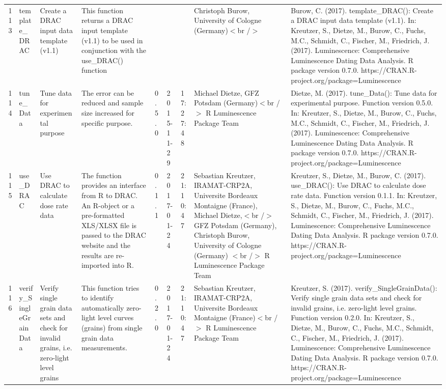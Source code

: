 \begin{table}[ht]
\begin{tabular}{rllllllll}
 \\ 
  113 & template\_DRAC & Create a DRAC input data template (v1.1) & This function returns a DRAC input template (v1.1) to be used in conjunction with the use\_DRAC() function &  &  &  & Christoph Burow, University of Cologne (Germany)$<$br /$>$ & Burow, C. (2017). template\_DRAC(): Create a DRAC input data template (v1.1). In: Kreutzer, S., Dietze, M., Burow, C., Fuchs, M.C., Schmidt, C., Fischer, M., Friedrich, J. (2017). Luminescence: Comprehensive Luminescence Dating Data Analysis. R package version 0.7.0. https://CRAN.R-project.org/package=Luminescence
 \\ 
  114 & tune\_Data & Tune data for experimental purpose & The error can be reduced and sample size increased for specific purpose. & 0.5.0 & 2015-11-29 & 17:27:48
 & Michael Dietze, GFZ Potsdam (Germany)$<$br /$>$  R Luminescence Package Team & Dietze, M. (2017). tune\_Data(): Tune data for experimental purpose. Function version 0.5.0. In: Kreutzer, S., Dietze, M., Burow, C., Fuchs, M.C., Schmidt, C., Fischer, M., Friedrich, J. (2017). Luminescence: Comprehensive Luminescence Dating Data Analysis. R package version 0.7.0. https://CRAN.R-project.org/package=Luminescence
 \\ 
  115 & use\_DRAC & Use DRAC to calculate dose rate data & The function provides an interface from R to DRAC. An R-object or a pre-formatted XLS/XLSX file is passed to the DRAC website and the results are re-imported into R. & 0.1.1 & 2017-01-24 & 21:10:47
 & Sebastian Kreutzer, IRAMAT-CRP2A, Universite Bordeaux Montaigne (France), Michael Dietze,$<$br /$>$ GFZ Potsdam (Germany), Christoph Burow, University of Cologne (Germany) $<$br /$>$  R Luminescence Package Team & Kreutzer, S., Dietze, M., Burow, C. (2017). use\_DRAC(): Use DRAC to calculate dose rate data. Function version 0.1.1. In: Kreutzer, S., Dietze, M., Burow, C., Fuchs, M.C., Schmidt, C., Fischer, M., Friedrich, J. (2017). Luminescence: Comprehensive Luminescence Dating Data Analysis. R package version 0.7.0. https://CRAN.R-project.org/package=Luminescence
 \\ 
  116 & verify\_SingleGrainData & Verify single grain data sets and check for invalid grains, i.e. zero-light level grains & This function tries to identify automatically zero-light level curves (grains) from single grain data measurements. & 0.2.0 & 2017-01-24 & 21:10:47
 & Sebastian Kreutzer, IRAMAT-CRP2A, Universite Bordeaux Montaigne (France)$<$br /$>$  R Luminescence Package Team & Kreutzer, S. (2017). verify\_SingleGrainData(): Verify single grain data sets and check for invalid grains, i.e. zero-light level grains. Function version 0.2.0. In: Kreutzer, S., Dietze, M., Burow, C., Fuchs, M.C., Schmidt, C., Fischer, M., Friedrich, J. (2017). Luminescence: Comprehensive Luminescence Dating Data Analysis. R package version 0.7.0. https://CRAN.R-project.org/package=Luminescence

\end{tabular}
\end{table}
